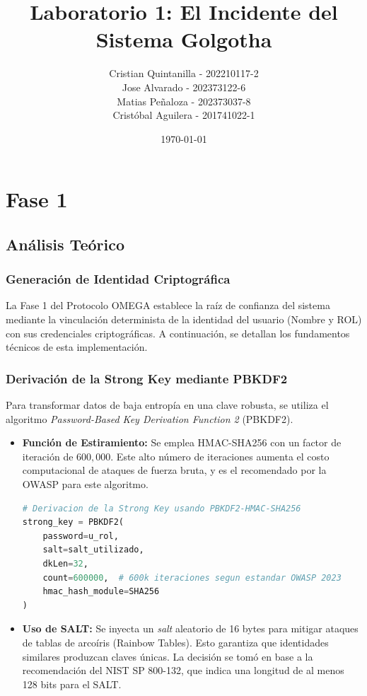 \documentclass{article}
\title{Laboratorio 1: El Incidente del Sistema Golgotha}
\author{
    Cristian Quintanilla - 202210117-2 \\
    Jose Alvarado - 202373122-6 \\
    Matias Peñaloza - 202373037-8 \\
    Cristóbal Aguilera - 201741022-1
}
\date{\today}
\begin{document}
\maketitle

\section{Fase 1}
\subsection{Análisis Teórico}
\subsubsection{Generación de Identidad Criptográfica}

La Fase 1 del Protocolo OMEGA establece la raíz de confianza del sistema mediante la vinculación determinista de la identidad del usuario (Nombre y ROL) con sus credenciales criptográficas. A continuación, se detallan los fundamentos técnicos de esta implementación.

\subsubsection{Derivación de la Strong Key mediante PBKDF2}
Para transformar datos de baja entropía en una clave robusta, se utiliza el algoritmo \textit{Password-Based Key Derivation Function 2} (PBKDF2).

\begin{itemize}
    \item \textbf{Función de Estiramiento:} Se emplea HMAC-SHA256 con un factor de iteración de $600,000$. Este alto número de iteraciones aumenta el costo computacional de ataques de fuerza bruta, y es el recomendado por la OWASP para este algoritmo.

\begin{lstlisting}[language=Python, caption=Implementación de derivación de clave con estándar OWASP]
# Derivacion de la Strong Key usando PBKDF2-HMAC-SHA256
strong_key = PBKDF2(
    password=u_rol, 
    salt=salt_utilizado, 
    dkLen=32, 
    count=600000,  # 600k iteraciones segun estandar OWASP 2023
    hmac_hash_module=SHA256
)
\end{lstlisting}
    
    \item \textbf{Uso de SALT:} Se inyecta un \textit{salt} aleatorio de 16 bytes para mitigar ataques de tablas de arcoíris (Rainbow Tables). Esto garantiza que identidades similares produzcan claves únicas.
    La decisión se tomó en base a la recomendación del NIST SP 800-132, que indica una longitud de al menos 128 bits para el SALT.
\end{itemize}
\end{document}
